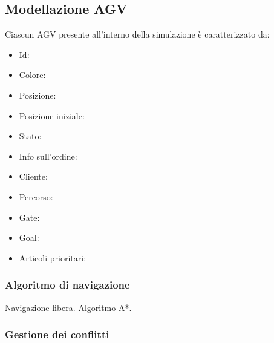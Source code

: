 \documentclass[12pt]{article}
\begin{document}
\subsection{Modellazione AGV}
Ciascun AGV presente all'interno della simulazione è caratterizzato da:
\begin{itemize}
\item Id:
\item Colore:
\item Posizione:
\item Posizione iniziale:
\item Stato:
\item Info sull'ordine:
\item Cliente:
\item Percorso:
\item Gate:
\item Goal:
\item Articoli prioritari:

\end{itemize}
\subsubsection{Algoritmo di navigazione}
Navigazione libera. Algoritmo A*.

\subsubsection{Gestione dei conflitti}

\newpage
\end{document}

